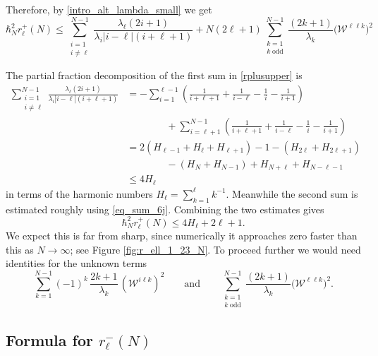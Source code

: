 \documentclass[11pt]{amsart}
\numberwithin{equation}{section}
\theoremstyle{definition}
\begin{document}
Therefore, by \eqref{intro_alt_lambda_small} we get
\begin{equation}\label{rplusupper}
\hbar_N^2 r_\ell^+(N)
\le 
\sum\limits_{\substack{i = 1 \\ i\neq \ell}}^{N-1}
\frac{\lambda_{\ell} (2i+1)}{\lambda_i|i-\ell|(i+\ell+1)} 
+
N(2\ell+1)
\sum\limits_{\substack{k = 1 \\ k \;\mathrm{odd}}}^{N-1}
\frac{(2k+1)}{\lambda_{k}}\big(\mathcal{W}^{\ell\ell k}\big)^2
\end{equation}


The partial fraction decomposition of the first sum in \eqref{rplusupper} is 
\begin{align*}
\sum\limits_{\substack{i = 1 \\ i\neq \ell}}^{N-1}
\frac{\lambda_{\ell} (2i+1)}{\lambda_i|i-\ell|(i+\ell+1)}  &= -\sum_{i=1}^{\ell-1} \left( \frac{1}{i+\ell+1} + \frac{1}{i-\ell} - \frac{1}{i} - \frac{1}{i+1}\right)  \\
&\qquad\qquad
    + \sum_{i=\ell+1}^{N-1} \left( \frac{1}{i+\ell+1} + \frac{1}{i-\ell} - \frac{1}{i} - \frac{1}{i+1}\right) \\
    &= 2(H_{\ell-1}+H_{\ell}+H_{\ell+1}) - 1 -( H_{2\ell}+H_{2\ell+1}) \\
    &\qquad\qquad -(H_N + H_{N-1}) + H_{N+\ell} + H_{N-\ell-1} \\
    &\le 4H_{\ell}
\end{align*}
in terms of the harmonic numbers $H_{\ell} = \sum_{k=1}^{\ell} k^{-1}$. Meanwhile 
the second sum is estimated roughly using \eqref{eq_sum_6j}. Combining the two estimates gives 
$$ \hbar_N^2 r_\ell^+(N) \le 4H_{\ell}+2\ell+1.$$
We expect this is far from sharp, since numerically it approaches zero faster than this as $N\to\infty$; see Figure \ref{fig:r_ell_1_23_N}. To proceed further we would need identities for the unknown terms 
$$ \sum_{k=1}^{N-1} (-1)^k \, \frac{2k+1}{\lambda_k} \, (\mathcal{W}^{i\ell k})^2 \qquad \text{and}\qquad \sum\limits_{\substack{k = 1 \\ k \;\mathrm{odd}}}^{N-1}
\frac{(2k+1)}{\lambda_{k}}\big(\mathcal{W}^{\ell\ell k}\big)^2.
$$ 

\color{black}



\subsection{Formula for $r_{\ell}^-(N)$}
\end{document}
